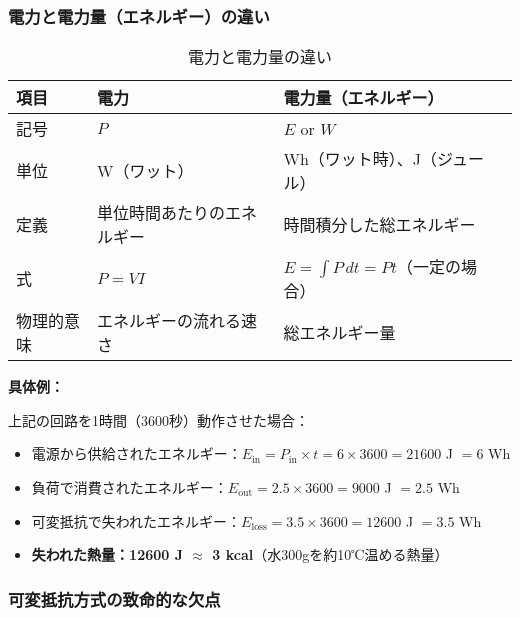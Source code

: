 \subsubsection{電力と電力量（エネルギー）の違い}

\begin{table}[H]
\centering
\caption{電力と電力量の違い}
\begin{tabular}{|l|l|l|l|}
\hline
\textbf{項目} & \textbf{電力} & \textbf{電力量（エネルギー）} \\
\hline
\hline
記号 & $P$ & $E$ or $W$ \\
\hline
単位 & W（ワット） & Wh（ワット時）、J（ジュール） \\
\hline
定義 & 単位時間あたりのエネルギー & 時間積分した総エネルギー \\
\hline
式 & $P = VI$ & $E = \int P \, dt = Pt$（一定の場合） \\
\hline
物理的意味 & エネルギーの流れる速さ & 総エネルギー量 \\
\hline
\end{tabular}
\end{table}

\begin{screen}
\textbf{具体例：}

上記の回路を1時間（3600秒）動作させた場合：

\begin{itemize}
\item 電源から供給されたエネルギー：$E_{\text{in}} = P_{\text{in}} \times t = 6 \times 3600 = 21600$ J $= 6$ Wh

\item 負荷で消費されたエネルギー：$E_{\text{out}} = 2.5 \times 3600 = 9000$ J $= 2.5$ Wh

\item 可変抵抗で失われたエネルギー：$E_{\text{loss}} = 3.5 \times 3600 = 12600$ J $= 3.5$ Wh

\item \textbf{失われた熱量：12600 J $\approx$ 3 kcal}（水300gを約10℃温める熱量）
\end{itemize}
\end{screen}

\subsubsection{可変抵抗方式の致命的な欠点}


